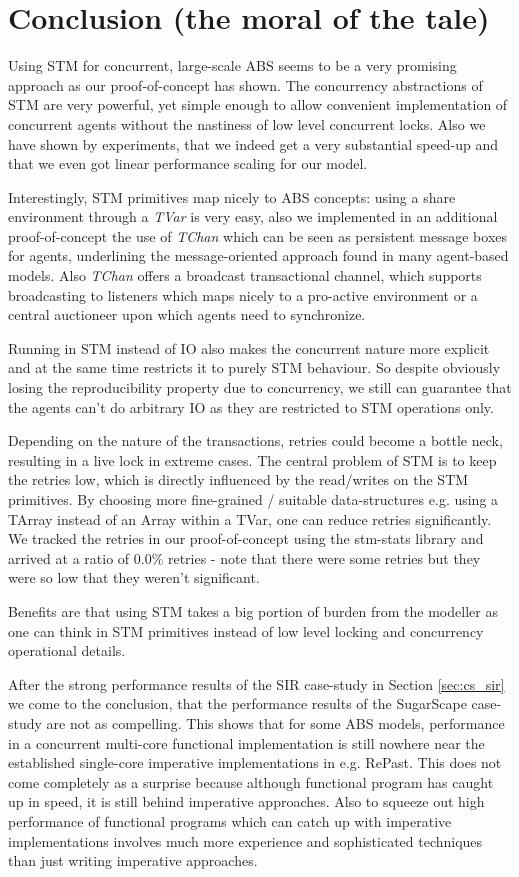 \section{Conclusion (the moral of the tale)}
Using STM for concurrent, large-scale ABS seems to be a very promising approach as our proof-of-concept has shown. The concurrency abstractions of STM are very powerful, yet simple enough to allow convenient implementation of concurrent agents without the nastiness of low level concurrent locks. Also we have shown by experiments, that we indeed get a very substantial speed-up and that we even got linear performance scaling for our model. 

Interestingly, STM primitives map nicely to ABS concepts: using a share environment through a \textit{TVar} is very easy, also we implemented in an additional proof-of-concept the use of \textit{TChan} which can be seen as persistent message boxes for agents, underlining the message-oriented approach found in many agent-based models. Also \textit{TChan} offers a broadcast transactional channel, which supports broadcasting to listeners which maps nicely to a pro-active environment or a central auctioneer upon which agents need to synchronize.

Running in STM instead of IO also makes the concurrent nature more explicit and at the same time restricts it to purely STM behaviour. So despite obviously losing the reproducibility property due to concurrency, we still can guarantee that the agents can't do arbitrary IO as they are restricted to STM operations only.

Depending on the nature of the transactions, retries could become a bottle neck, resulting in a live lock in extreme cases. The central problem of STM is to keep the retries low, which is directly influenced by the read/writes on the STM primitives. By choosing more fine-grained / suitable data-structures e.g. using a TArray instead of an Array within a TVar, one can reduce retries significantly. We tracked the retries in our proof-of-concept using the stm-stats library and arrived at a ratio of 0.0\% retries - note that there were some retries but they were so low that they weren't significant.

Benefits are that using STM takes a big portion of burden from the modeller as one can think in STM primitives instead of low level locking and concurrency operational details.

After the strong performance results of the SIR case-study in Section \ref{sec:cs_sir} we come to the conclusion, that the performance results of the SugarScape case-study are not as compelling. This shows that for some ABS models, performance in a concurrent multi-core functional implementation is still nowhere near the established single-core imperative implementations in e.g. RePast. This does not come completely as a surprise because although functional program has caught up in speed, it is still behind imperative approaches. Also to squeeze out high performance of functional programs which can catch up with imperative implementations involves much more experience and sophisticated techniques than just writing imperative approaches.

